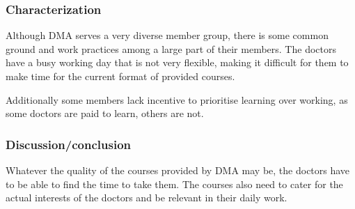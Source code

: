 \subsubsection{Characterization}
Although DMA serves a very diverse member group, there is some common ground and work practices among a large part of their members. The doctors have a busy working day that is not very flexible, making it difficult for them to make time for the current format of provided courses.

Additionally some members lack incentive to prioritise learning over working, as some doctors are paid to learn, others are not.

\subsubsection{Discussion/conclusion}
Whatever the quality of the courses provided by DMA may be, the doctors have to be able to find the time to take them. The courses also need to cater for the actual interests of the doctors and be relevant in their daily work.

